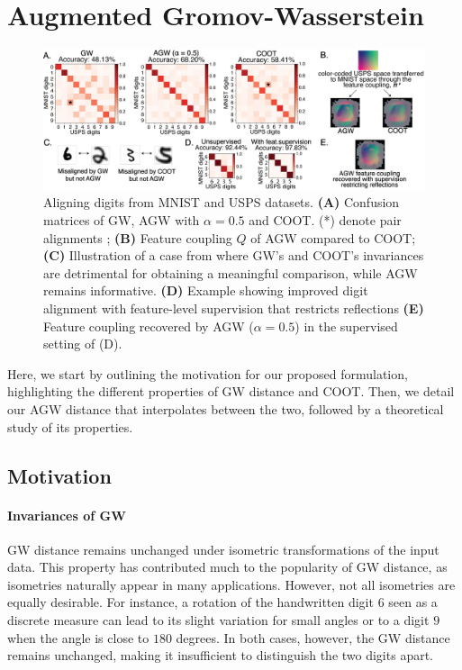 \section{Augmented Gromov-Wasserstein}

\begin{figure}[t]
\centering
\includegraphics[width=\linewidth]{./Chapitre5/fig//mnist1_supervised.png}
\caption[Aligning digits from MNIST and USPS datasets]{Aligning digits from MNIST and USPS datasets. \textbf{(A)}
Confusion matrices of GW, AGW with $\alpha=0.5$ and COOT.
(*) denote pair alignments ;
\textbf{(B)} Feature coupling $Q$ of AGW compared to COOT;
\textbf{(C)} Illustration of a case from where GW's and COOT's invariances are
detrimental for obtaining a meaningful comparison, while AGW remains informative.
\textbf{(D)} Example showing improved digit alignment with feature-level supervision
that restricts reflections \textbf{(E)} Feature coupling recovered by AGW ($\alpha =0.5$)
in the supervised setting of (D).}
\label{fig:mnist}
\end{figure}

Here, we start by outlining the motivation for our proposed formulation,
highlighting the different properties of GW distance and COOT. Then,
we detail our AGW distance that interpolates between the two, followed by a
theoretical study of its properties.

\subsection{Motivation}

\paragraph{Invariances of GW} GW distance remains unchanged under isometric transformations of
the input data. This property has contributed much to the popularity of GW distance,
as isometries naturally appear in many applications. However,
not all isometries are equally desirable. For instance, a rotation of the
handwritten digit $6$ seen as a discrete measure can lead to its slight variation
for small angles or to a digit $9$ when the angle is close to $180$ degrees. In both cases,
however, the GW distance remains unchanged, making it insufficient to distinguish
the two digits apart.

